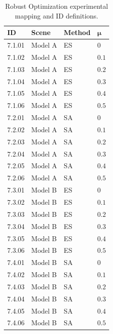 \begin{table}[!t]
\centering
\footnotesize
\caption{Robust Optimization experimental mapping and ID definitions.}
\label{tab:robust_params}
\begin{tabular}{@{}llll@{}}
\hline
    \textbf{ID} & \textbf{Scene} & \textbf{Method} & $\bm{\mu}$ \\
\hline
    7.1.01 & Model A & ES & $0$ \\
    7.1.02 & Model A & ES & $0.1$ \\
    7.1.03 & Model A & ES & $0.2$ \\
    7.1.04 & Model A & ES & $0.3$ \\
    7.1.05 & Model A & ES & $0.4$ \\
    7.1.06 & Model A & ES & $0.5$ \\
    \noalign{\smallskip}
    7.2.01 & Model A & SA & $0$ \\
    7.2.02 & Model A & SA & $0.1$ \\
    7.2.03 & Model A & SA & $0.2$ \\
    7.2.04 & Model A & SA & $0.3$ \\
    7.2.05 & Model A & SA & $0.4$ \\
    7.2.06 & Model A & SA & $0.5$ \\
    \noalign{\smallskip}
    7.3.01 & Model B & ES & $0$ \\
    7.3.02 & Model B & ES & $0.1$ \\
    7.3.03 & Model B & ES & $0.2$ \\
    7.3.04 & Model B & ES & $0.3$ \\
    7.3.05 & Model B & ES & $0.4$ \\
    7.3.06 & Model B & ES & $0.5$ \\
    \noalign{\smallskip}
    7.4.01 & Model B & SA & $0$ \\
    7.4.02 & Model B & SA & $0.1$ \\
    7.4.03 & Model B & SA & $0.2$ \\
    7.4.04 & Model B & SA & $0.3$ \\
    7.4.05 & Model B & SA & $0.4$ \\
    7.4.06 & Model B & SA & $0.5$ \\
\hline
\end{tabular}
\end{table}